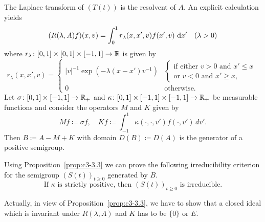 \begin{examples}
\begin{enumerate}
	The Laplace transform of $(T(t))$ is the resolvent of $A$.
	An explicit calculation yields
	\begin{equation}\label{eq:c3-3.5}
		(R(\lambda,A)f)(x,v) = \int_{0}^{1} r_{\lambda}(x,x',v)f(x',v)\,\mathop{}\!\mathrm{d}{x}' \quad (\lambda > 0)
	\end{equation}
	where $r_{\lambda} \colon [0,1] \times [0,1] \times [-1,1] \to \mathbb{R} $ is given by
	\begin{equation*}\label{eq:c3-r_lambda}
		r_{\lambda}(x,x',v) = \begin{cases}
			|v|^{-1}\exp(-\lambda(x-x')v^{-1}) & 
			\begin{cases}\text{if either } v>0 \text{ and } x'\leq x \\
		    \text{or } v<0 \text{ and } x'\geq x, 
		    \end{cases}\\
			0 & \text{otherwise}.
		\end{cases}
	\end{equation*}
	Let $\sigma \colon [0,1]\times[-1,1] \to \mathbb{R} _{+}$ and $\kappa \colon [0,1]\times[-1,1]\times[-1,1] \to \mathbb{R} _{+}$ be measurable functions and consider the operators $M$ and $K$ given by
	\begin{equation}\label{eq:c3-3.6}
		Mf \coloneqq \sigma f, \quad Kf \coloneqq \int_{-1}^{1} \kappa(\cdot,\cdot,v')f(\cdot,v')\,dv'.
	\end{equation}
	Then $B \coloneqq A - M + K$ with domain $D(B) \coloneqq D(A)$ is the generator of a positive semigroup.
	
	Using Proposition~\ref{prop:c3-3.3} we can prove the following irreducibility criterion for the semigroup $(S(t))_{t\geq 0}$ generated by $B$.
	\begin{equation}\label{eq:c3-3.7}
		\text{If } \kappa \text{ is strictly positive, then } (S(t))_{t\geq 0} \text{ is irreducible.}
	\end{equation}
	
	Actually, in view of Proposition~\ref{prop:c3-3.3}, we have to show that a closed ideal which is invariant under $R(\lambda,A)$ and $K$ has to be $\{0\}$ or $E$.
	

\end{enumerate}
\end{examples}
